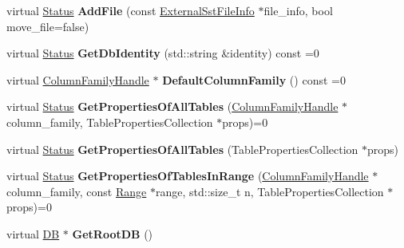 \begin{DoxyCompactItemize}
\item 
virtual \hyperlink{classrocksdb_1_1Status}{Status} {\bfseries Add\+File} (const \hyperlink{structrocksdb_1_1ExternalSstFileInfo}{External\+Sst\+File\+Info} $\ast$file\+\_\+info, bool move\+\_\+file=false)\hypertarget{classrocksdb_1_1DB_a4cb68b0602b9b312abe680e7916e717f}{}\label{classrocksdb_1_1DB_a4cb68b0602b9b312abe680e7916e717f}

\item 
virtual \hyperlink{classrocksdb_1_1Status}{Status} {\bfseries Get\+Db\+Identity} (std\+::string \&identity) const =0\hypertarget{classrocksdb_1_1DB_ae25bfa14c79c2a314fb2c2b9b15c8878}{}\label{classrocksdb_1_1DB_ae25bfa14c79c2a314fb2c2b9b15c8878}

\item 
virtual \hyperlink{classrocksdb_1_1ColumnFamilyHandle}{Column\+Family\+Handle} $\ast$ {\bfseries Default\+Column\+Family} () const =0\hypertarget{classrocksdb_1_1DB_a9f835f7c274965147732d1e4ac14d640}{}\label{classrocksdb_1_1DB_a9f835f7c274965147732d1e4ac14d640}

\item 
virtual \hyperlink{classrocksdb_1_1Status}{Status} {\bfseries Get\+Properties\+Of\+All\+Tables} (\hyperlink{classrocksdb_1_1ColumnFamilyHandle}{Column\+Family\+Handle} $\ast$column\+\_\+family, Table\+Properties\+Collection $\ast$props)=0\hypertarget{classrocksdb_1_1DB_a2fdc357ae5ec32baa1b0a1fb075e172f}{}\label{classrocksdb_1_1DB_a2fdc357ae5ec32baa1b0a1fb075e172f}

\item 
virtual \hyperlink{classrocksdb_1_1Status}{Status} {\bfseries Get\+Properties\+Of\+All\+Tables} (Table\+Properties\+Collection $\ast$props)\hypertarget{classrocksdb_1_1DB_a15dcf2da4443fcc770cefafb8cb7c5a5}{}\label{classrocksdb_1_1DB_a15dcf2da4443fcc770cefafb8cb7c5a5}

\item 
virtual \hyperlink{classrocksdb_1_1Status}{Status} {\bfseries Get\+Properties\+Of\+Tables\+In\+Range} (\hyperlink{classrocksdb_1_1ColumnFamilyHandle}{Column\+Family\+Handle} $\ast$column\+\_\+family, const \hyperlink{structrocksdb_1_1Range}{Range} $\ast$range, std\+::size\+\_\+t n, Table\+Properties\+Collection $\ast$props)=0\hypertarget{classrocksdb_1_1DB_aca4860f05fa06107b59c48c6930c848c}{}\label{classrocksdb_1_1DB_aca4860f05fa06107b59c48c6930c848c}

\item 
virtual \hyperlink{classrocksdb_1_1DB}{DB} $\ast$ {\bfseries Get\+Root\+DB} ()\hypertarget{classrocksdb_1_1DB_a8b5ad7e30644b9dbe7a95eaa94939c87}{}\label{classrocksdb_1_1DB_a8b5ad7e30644b9dbe7a95eaa94939c87}

\end{DoxyCompactItemize}
